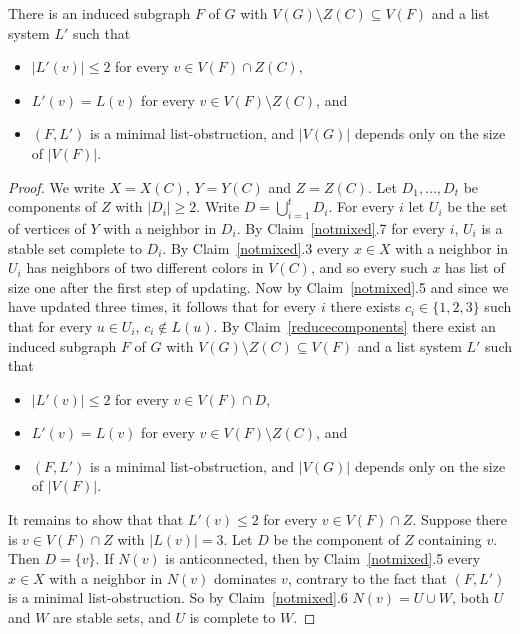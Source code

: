 \documentclass[11pt]{article}
\begin{document}
\begin{claim}\label{noZ}
There is an induced subgraph $F$ of $G$ with 
$V(G) \setminus Z(C) \subseteq V(F)$ and a list system $L'$ such that
\begin{itemize}  
\item $|L'(v)| \leq 2$ for every $v \in V(F) \cap Z(C)$,
\item $L'(v)=L(v)$ for every $v \in V(F) \setminus Z(C)$, and
\item $(F,L')$ is a minimal list-obstruction, and $|V(G)|$ depends only on
the size of $|V(F)|$.
\end{itemize}
\end{claim}

\begin{proof}
We write $X=X(C)$, $Y=Y(C)$ and $Z=Z(C)$. 
Let $D_1, \ldots, D_t$ be components of $Z$ with $|D_i| \geq 2$.
Write $D= \bigcup_{i=1}^t D_i$.
For every $i$ let $U_i$ be the set of vertices of $Y$ with a neighbor in $D_i$.
By Claim~\ref{notmixed}.7 for every $i$, $U_i$ is  a stable set complete to 
$D_i$. 
By Claim~\ref{notmixed}.3 every $x \in X$ with a neighbor in $U_i$ has 
neighbors of two different colors in $V(C)$, and so every such $x$ has
list of size one after the first step of updating. Now  
by Claim~\ref{notmixed}.5  and since we have updated three times,  it 
follows that for every $i$  there exists $c_i \in \{1,2,3\}$ such that for 
every $u \in U_i$, $c_i \not \in L(u)$.  
By Claim~\ref{reducecomponents} there exist 
an induced subgraph $F$ of $G$ with 
$V(G) \setminus Z(C) \subseteq V(F)$ and a list system $L'$  such that
\begin{itemize}  
\item $|L'(v)| \leq 2$ for every $v \in V(F) \cap D$,
\item $L'(v)=L(v)$ for every $v \in V(F) \setminus Z(C)$, and
\item $(F,L')$ is a minimal list-obstruction, and $|V(G)|$ depends only on
the size of $|V(F)|$.
\end{itemize}


It remains to show that that $L'(v) \leq 2$ for every 
$v \in V(F) \cap Z$.
Suppose there is $v \in V(F) \cap Z$ with $|L(v)|=3$. 
Let $D$ be the component of $Z$ containing $v$. Then  $D=\{v\}$.
If $N(v)$ is anticonnected, then by Claim~\ref{notmixed}.5 every $x \in X$ with a
neighbor in $N(v)$ dominates $v$, contrary to the fact that $(F,L')$ is a minimal list-obstruction. So 
by Claim~\ref{notmixed}.6 $N(v)=U \cup W$, both $U$ and $W$ are stable sets, and 
$U$ is complete to $W$.


\end{proof}
\end{document}
